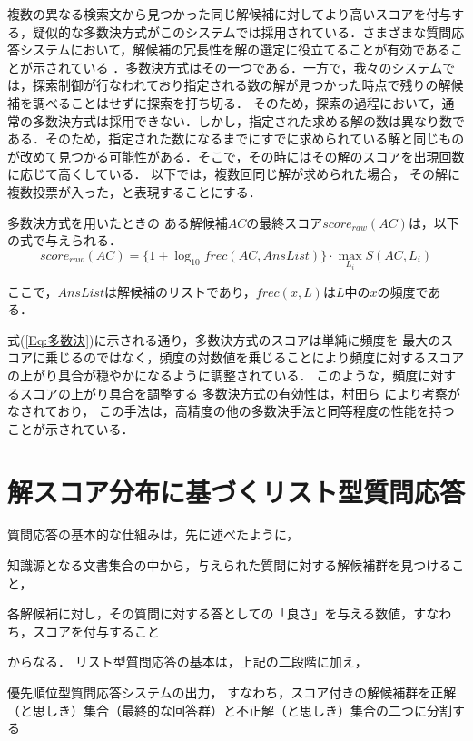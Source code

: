 \documentclass[japanese]{jnlp_1.4}
\begin{document}
複数の異なる検索文から見つかった同じ解候補に対してより高いスコアを付与する，疑似的な多数決方式がこのシステムでは採用されている．さまざまな質問応答システムにおいて，解候補の冗長性を解の選定に役立てることが有効であることが示されている
\cite{Clarke:Exploitingredundancyinquestionanswering}\cite{Xu:TREC2003QAatBBN:Answeringdefinitionalquestions}．多数決方式はその一つである．一方で，我々のシステムでは，探索制御が行なわれており指定される数の解が見つかった時点で残りの解候補を調べることはせずに探索を打ち切る．
そのため，探索の過程において，通常の多数決方式は採用できない．しかし，指定された求める解の数は異なり数である．そのため，指定された数になるまでにすでに求められている解と同じものが改めて見つかる可能性がある．そこで，その時にはその解のスコアを出現回数に応じて高くしている．
以下では，複数回同じ解が求められた場合，
その解に複数投票が入った，と表現することにする．

多数決方式を用いたときの
ある解候補$AC$の最終スコア$score_{raw}(AC)$は，以下の式で与えられる．
\begin{equation}
score_{raw}(AC) = \{1+\log_{10} frec(AC,AnsList)\} \cdot  \max_{L_i} S(AC,L_i)
\label{Eq:多数決}
\end{equation}

ここで，$AnsList$は解候補のリストであり，$frec(x,L)$は$L$中の$x$の頻度である．

式(\ref{Eq:多数決})に示される通り，多数決方式のスコアは単純に頻度を
最大のスコアに乗じるのではなく，頻度の対数値を乗じることにより頻度に対するスコアの上がり具合が穏やかになるように調整されている．
このような，頻度に対するスコアの上がり具合を調整する
多数決方式の有効性は，村田ら
\cite{Murata:DcreasedAddingJapaneseQusetionAnswering}
により考察がなされており，
この手法は，高精度の他の多数決手法と同等程度の性能を持つことが示されている．

\newcommand{\InH}[1]{}


\section{解スコア分布に基づくリスト型質問応答}\label{Chapter:list-qa}

質問応答の基本的な仕組みは，先に述べたように，
\par\InH{段階1}
 知識源となる文書集合の中から，与えられた質問に対する解候補群を見つけること，

\InH{段階2}
 各解候補に対し，その質問に対する答としての「良さ」を与える数値，すなわち，スコアを付与すること

\noindent
からなる．
リスト型質問応答の基本は，上記の二段階に加え，
\par\InH{段階3}
 優先順位型質問応答システムの出力，
 すなわち，スコア付きの解候補群を正解（と思しき）集合（最終的な回答群）と不正解（と思しき）集合の二つに分割する
\end{document}
